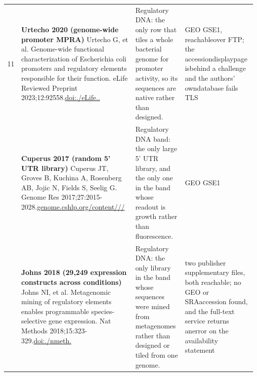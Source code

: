 \begin{landscape}
\begin{longtable}{@{}r@{\hspace{4pt}} L{78mm} L{72mm} L{76mm}@{}}
11 & \textbf{Urtecho 2020 (genome-wide promoter MPRA)} \newline Urtecho G, et al. Genome-wide functional characterization of Escherichia coli promoters and regulatory elements responsible for their function. eLife Reviewed Preprint 2023;12:92558.\newline \href{https://doi.org/10.7554/eLife.92558.1}{doi:./\allowbreak eLife..} & Regulatory DNA: the only row that tiles a whole bacterial genome for promoter activity, so its sequences are native rather than designed. & GEO GSE1, r\allowbreak eachable\allowbreak  over FT\allowbreak P; the a\allowbreak ccession\allowbreak  display\allowbreak  page is\allowbreak  behind \allowbreak a challe\allowbreak nge and \allowbreak the auth\allowbreak ors' own\allowbreak  databas\allowbreak e fails \allowbreak TLS \\
 & \textbf{Cuperus 2017 (random 5' UTR library)} \newline Cuperus JT, Groves B, Kuchina A, Rosenberg AB, Jojic N, Fields S, Seelig G. Genome Res 2017;27:2015-2028.\newline \href{https://genome.cshlp.org/content/27/12/2015}{genome.\allowbreak cshlp.\allowbreak org/\allowbreak content\allowbreak ///} & Regulatory DNA band: the only large 5' UTR library, and the only one in the band whose readout is growth rather than fluorescence. & GEO GSE1 \\
 & \textbf{Johns 2018 (29,249 expression constructs across conditions)} \newline Johns NI, et al. Metagenomic mining of regulatory elements enables programmable species-selective gene expression. Nat Methods 2018;15:323-329.\newline \href{https://doi.org/10.1038/nmeth.4633}{doi:./\allowbreak nmeth.} & Regulatory DNA: the only library in the band whose sequences were mined from metagenomes rather than designed or tiled from one genome. & two publ\allowbreak isher su\allowbreak pplement\allowbreak ary file\allowbreak s, both \allowbreak reachabl\allowbreak e; no GE\allowbreak O or SRA\allowbreak  accessi\allowbreak on found\allowbreak , and th\allowbreak e full-\allowbreak text se\allowbreak rvice re\allowbreak turns an\allowbreak  error o\allowbreak n the av\allowbreak ailabili\allowbreak ty state\allowbreak ment \\

\end{longtable}
\end{landscape}
